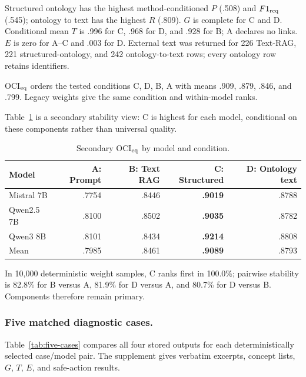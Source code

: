 \documentclass[runningheads]{llncs}
\begin{document}
Structured ontology has the highest method-conditioned $P$ (.508) and $F1_{\rm req}$ (.545); ontology to text has the highest $R$ (.809). $G$ is complete for C and D. Conditional mean $T$ is .996 for C, .968 for D, and .928 for B; A declares no links. $E$ is zero for A--C and .003 for D. External text was returned for 226 Text-RAG, 221 structured-ontology, and 242 ontology-to-text rows; every ontology row retains identifiers.

OCI$_{\rm eq}$ orders the tested conditions C, D, B, A with means .909, .879, .846, and .799. Legacy weights give the same condition and within-model ranks.

Table~\ref{tab:model-index} is a secondary stability view: C is highest for each model, conditional on these components rather than universal quality.

\begin{table}[!h]
\caption{Secondary OCI$_{\rm eq}$ by model and condition.}
\label{tab:model-index}
\centering
\scriptsize
\setlength{\tabcolsep}{5.0pt}
\begin{tabular}{@{}>{\raggedright\arraybackslash}p{2.65cm}rrrr@{}}
\toprule
\textbf{Model} & \textbf{A: Prompt} & \textbf{B: Text RAG} &
\textbf{C: Structured} & \textbf{D: Ontology text}\\
\midrule
Mistral 7B & .7754 & .8446 & \textbf{.9019} & .8788\\
Qwen2.5 7B & .8100 & .8502 & \textbf{.9035} & .8782\\
Qwen3 8B & .8101 & .8434 & \textbf{.9214} & .8808\\
\midrule
Mean       & .7985 & .8461 & \textbf{.9089} & .8793\\
\bottomrule
\end{tabular}
\end{table}

In 10,000 deterministic weight samples, C ranks first in 100.0\%; pairwise stability is 82.8\% for B versus A, 81.9\% for D versus A, and 80.7\% for D versus B. Components therefore remain primary.

\subsubsection{Five matched diagnostic cases.}
Table~\ref{tab:five-cases} compares all four stored outputs for each deterministically selected case/model pair. The supplement gives verbatim excerpts, concept lists, $G$, $T$, $E$, and safe-action results.
\end{document}
